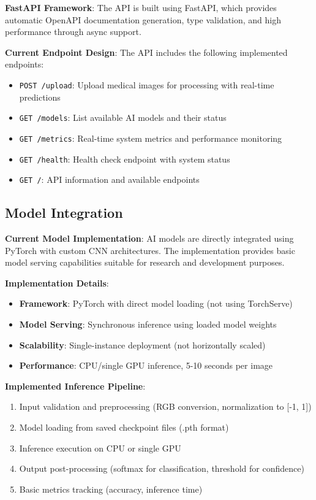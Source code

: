 \documentclass[12pt,a4paper]{article}
\begin{document}
\textbf{FastAPI Framework}: The API is built using FastAPI, which provides automatic OpenAPI documentation generation, type validation, and high performance through async support.

\textbf{Current Endpoint Design}: The API includes the following implemented endpoints:

\begin{itemize}
    \item \texttt{POST /upload}: Upload medical images for processing with real-time predictions
    \item \texttt{GET /models}: List available AI models and their status
    \item \texttt{GET /metrics}: Real-time system metrics and performance monitoring
    \item \texttt{GET /health}: Health check endpoint with system status
    \item \texttt{GET /}: API information and available endpoints
\end{itemize}

\subsection{Model Integration}

\textbf{Current Model Implementation}: AI models are directly integrated using PyTorch with custom CNN architectures. The implementation provides basic model serving capabilities suitable for research and development purposes.

\textbf{Implementation Details}:
\begin{itemize}
    \item \textbf{Framework}: PyTorch with direct model loading (not using TorchServe)
    \item \textbf{Model Serving}: Synchronous inference using loaded model weights
    \item \textbf{Scalability}: Single-instance deployment (not horizontally scaled)
    \item \textbf{Performance}: CPU/single GPU inference, 5-10 seconds per image
\end{itemize}

\textbf{Implemented Inference Pipeline}:
\begin{enumerate}
    \item Input validation and preprocessing (RGB conversion, normalization to [-1, 1])
    \item Model loading from saved checkpoint files (.pth format)
    \item Inference execution on CPU or single GPU
    \item Output post-processing (softmax for classification, threshold for confidence)
    \item Basic metrics tracking (accuracy, inference time)
\end{enumerate}
\end{document}
